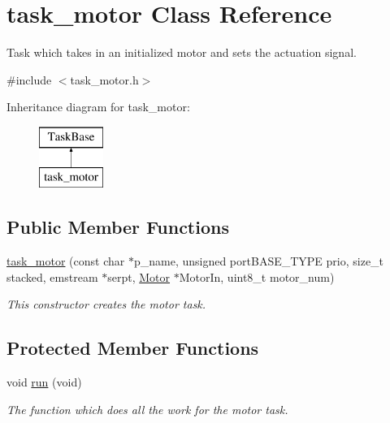 \hypertarget{classtask__motor}{}\section{task\+\_\+motor Class Reference}
\label{classtask__motor}


Task which takes in an initialized motor and sets the actuation signal.  




{\ttfamily \#include $<$task\+\_\+motor.\+h$>$}

Inheritance diagram for task\+\_\+motor\+:\begin{figure}[H]
\begin{center}
\leavevmode
\includegraphics[height=2.000000cm]{classtask__motor}
\end{center}
\end{figure}
\subsection*{Public Member Functions}
\begin{DoxyCompactItemize}
\item 
\hyperlink{classtask__motor_a3662c77ae8591a397ba53cf1640540d8}{task\+\_\+motor} (const char $\ast$p\+\_\+name, unsigned port\+B\+A\+S\+E\+\_\+\+T\+Y\+PE prio, size\+\_\+t stacked, emstream $\ast$serpt, \hyperlink{classMotor}{Motor} $\ast$Motor\+In, uint8\+\_\+t motor\+\_\+num)
\begin{DoxyCompactList}\small\item\em This constructor creates the motor task. \end{DoxyCompactList}\end{DoxyCompactItemize}
\subsection*{Protected Member Functions}
\begin{DoxyCompactItemize}
\item 
void \hyperlink{classtask__motor_a895a075ec470c9d5a07b8959de06aacd}{run} (void)
\begin{DoxyCompactList}\small\item\em The function which does all the work for the motor task. \end{DoxyCompactList}\end{DoxyCompactItemize}
